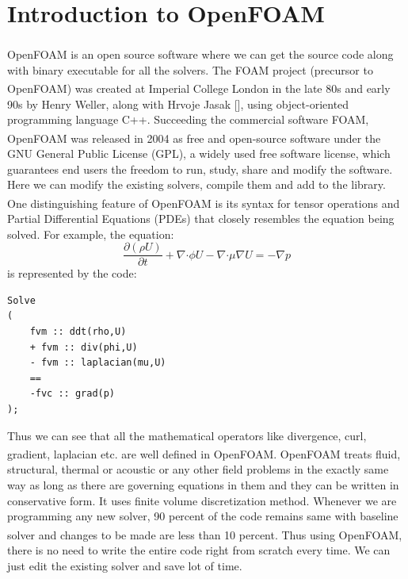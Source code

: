 \chapter{Introduction to \texorpdfstring{OpenFOAM\textsuperscript{\textregistered}}{Introduction to OpenFOAMs} }

\label{openfoam}

OpenFOAM\textsuperscript{\textregistered} is an open source software where we can get the source code along with binary executable for all the solvers. The FOAM project (precursor to OpenFOAM\textsuperscript{\textregistered}) was created at Imperial College London in the late 80s and early 90s by Henry Weller, along with Hrvoje Jasak [], using object-oriented programming language C++. Succeeding the commercial software FOAM, OpenFOAM\textsuperscript{\textregistered} was released in 2004 as free and open-source software under the GNU General Public License (GPL), a widely used free software license, which guarantees end users the freedom to run, study, share and modify the software. Here we can modify the existing solvers, compile them and add to the library. One distinguishing feature of OpenFOAM\textsuperscript{\textregistered} is its syntax for tensor operations and Partial Differential Equations (PDEs) that closely resembles the equation being solved. For example, the equation: 
\begin{equation}
\dfrac{\partial(\rho U)}{\partial t} + \nabla \boldsymbol{\cdot} \phi U - \nabla \boldsymbol{\cdot} \mu \nabla U = - \nabla p
\end{equation}
is represented by the code: 
\begin{verbatim}
Solve
(
	fvm :: ddt(rho,U)
	+ fvm :: div(phi,U)
	- fvm :: laplacian(mu,U)
	==
	-fvc :: grad(p)
);

\end{verbatim}

Thus we can see that all the mathematical operators like divergence, curl, gradient, laplacian etc. are well defined in OpenFOAM\textsuperscript{\textregistered}. OpenFOAM\textsuperscript{\textregistered} treats fluid, structural, thermal or acoustic or any other field problems in the exactly same way as long as there are governing equations in them and they can be written in conservative form. It uses finite volume discretization method. Whenever we are programming any new solver, 90 percent of the code remains same with baseline solver and changes to be made are less than 10 percent. Thus using OpenFOAM\textsuperscript{\textregistered}, there is no need to write the entire code right from scratch every time. We can just edit the existing solver and save lot of time.

